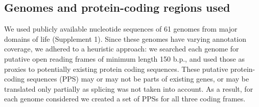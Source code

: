 \subsection{Genomes and protein-coding regions used}
We used publicly available nucleotide sequences of 61 genomes from major
domains of life (Supplement 1). Since these genomes have varying annotation
coverage, we adhered to a heuristic approach: we searched each genome for
putative open reading frames of minimum length 150 b.p., and used those as
proxies to potentially existing protein coding sequences. These putative
protein-coding sequences (PPS) may or may not be parts of existing genes, or
may be translated only partially as splicing was not taken into account.
As a result, for each genome considered we created a set of PPSs for all three
coding frames.
